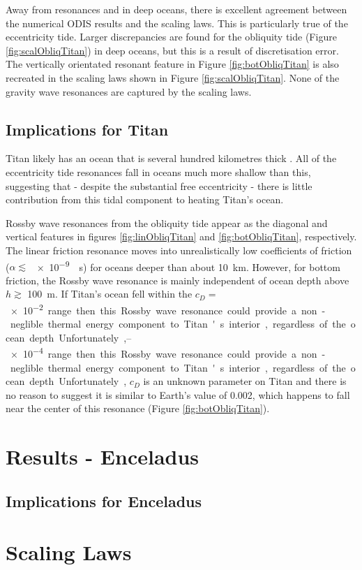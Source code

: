 Away from resonances and in deep oceans, there is excellent agreement between the numerical ODIS results and the scaling laws. This is particularly true of the eccentricity tide. Larger discrepancies are found for the obliquity tide (Figure \ref{fig:scalObliqTitan}) in deep oceans, but this is a result of discretisation error. The vertically orientated resonant feature in Figure \ref{fig:botObliqTitan} is also recreated in the scaling laws shown in Figure \ref{fig:scalObliqTitan}. None of the gravity wave resonances are captured by the scaling laws. 

\subsection{Implications for Titan}

Titan likely has an ocean that is several hundred kilometres thick \citep{sohl2003interior}. All of the eccentricity tide resonances fall in oceans much more shallow than this, suggesting that - despite the substantial free eccentricity - there is little contribution from this tidal component to heating Titan's ocean.

Rossby wave resonances from the obliquity tide appear as the diagonal and vertical features in figures \ref{fig:linObliqTitan} and \ref{fig:botObliqTitan}, respectively. The linear friction resonance moves into unrealistically low coefficients of friction ($\alpha \lesssim$ \SI{e-9}{\per\second}) for oceans deeper than about \SI{10}{\kilo\metre}. However, for bottom friction, the Rossby wave resonance is mainly independent of ocean depth above $h \gtrsim$ \SI{100}{\metre}. If Titan's ocean fell within the $c_D =$ \SIrange{e-2}{e-4} range then this Rossby wave resonance could provide a non-neglible thermal energy component to Titan's interior, regardless of the ocean depth. Unfortunately, $c_D$ is an unknown parameter on Titan and there is no reason to suggest it is similar to Earth's value of \num{0.002}, which happens to fall near the center of this resonance (Figure \ref{fig:botObliqTitan}).

\section{Results - Enceladus \label{sec:results_Enceladus}}

\subsection{Implications for Enceladus}

\section{Scaling Laws \label{subsec:scaling}}